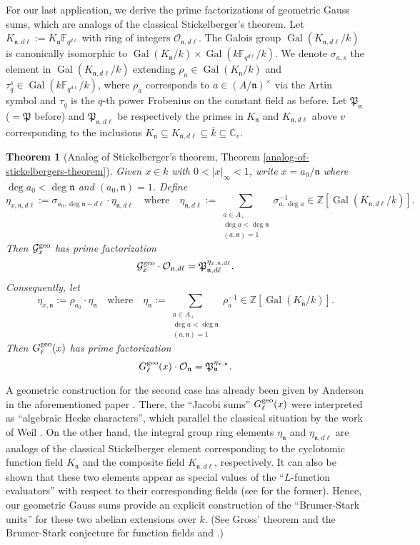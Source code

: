 \documentclass[11pt]{amsart}
\theoremstyle{plain}
\newtheorem{thm}{Theorem}[subsection]
\theoremstyle{definition}
\theoremstyle{remark}
\numberwithin{equation}{section}
\newcommand{\ZZ}{\mathbb{Z}}
\newcommand{\CC}{\mathbb{C}}
\newcommand{\FF}{\mathbb{F}}
\newcommand{\nfk}{\mathfrak{n}}
\newcommand{\Pfk}{\mathfrak{P}}
\newcommand{\Gcal}{\mathcal{G}}
\newcommand{\Ocal}{\mathcal{O}}
\newcommand{\Gal}{\operatorname{Gal}}
\newcommand{\ovl}{\overline}
\newcommand{\sbe}{\subseteq}
\newcommand{\Fqdl}{\FF_{q^{d\l}}}
\newcommand{\bggs}{\Gcal^{\textnormal{geo}}}
\newcommand{\ggs}{G_\l^{\textnormal{geo}}}
\let\l\ell
\begin{document}
	For our last application, we derive the prime factorizations of geometric Gauss sums, which are analogs of the classical Stickelberger's theorem.
	Let $K_{\nfk,d\l} := K_\nfk\Fqdl$ with ring of integers $\Ocal_{\nfk,d\l}$.
	The Galois group $\Gal(K_{\nfk,d\l}/k)$ is canonically isomorphic to $\Gal(K_\nfk/k) \times \Gal(k\Fqdl/k)$.
	We denote $\sigma_{a,s}$ the element in $\Gal(K_{\nfk,d\l}/k)$ extending $\rho_a \in \Gal(K_\nfk/k)$ and $\tau_q^s \in \Gal(k\Fqdl/k)$, where $\rho_a$ corresponds to $a \in (A/\nfk)^\times$ via the Artin symbol and $\tau_q$ is the $q$-th power Frobenius on the constant field as before.
	Let $\Pfk_{\nfk}$ ($=\Pfk$ before) and $\Pfk_{\nfk,d\l}$ be respectively the primes in $K_\nfk$ and $K_{\nfk,d\l}$ above $v$ corresponding to the inclusions $K_\nfk \sbe K_{\nfk,d\l} \sbe \ovl{k} \sbe \CC_v$.
	
	\begin{thm}[Analog of Stickelberger's theorem, Theorem \ref{analog-of-stickelbergers-theorem}]
		Given $x \in k$ with $0 < |x|_\infty < 1$, write $x = a_0/\nfk$ where $\deg a_0 < \deg \nfk$ and $(a_0,\nfk)=1$.
		Define
		$$
		\eta_{x,\nfk,d\l} := \sigma_{a_0,\deg \nfk - d\l} \cdot \eta_{\nfk,d\l}
		\quad
		\text{where}
		\quad
		\eta_{\nfk,d\l} := \sum_{\substack{a\in A_+ \\ \deg a < \deg \nfk \\ (a,\nfk)=1}}  \sigma_{a,\deg a}^{-1} \in \ZZ[\Gal(K_{\nfk,d\l}/k)].
		$$
		Then $\bggs_x$ has prime factorization
		$$
		\bggs_x \cdot \Ocal_{\nfk,d\l}
		= \Pfk_{\nfk,d\l}^{\eta_{x,\nfk,d\l}}.
		$$
		Consequently, let
		$$
		\eta_{x,\nfk} := \rho_{a_0} \cdot \eta_{\nfk}
		\quad
		\text{where}
		\quad
		\eta_{\nfk} := \sum_{\substack{a\in A_+ \\ \deg a < \deg \nfk \\ (a,\nfk)=1}}  \rho_a^{-1} \in \ZZ[\Gal(K_\nfk/k)].
		$$
		Then $\ggs(x)$ has prime factorization
		$$
		\ggs(x) \cdot \Ocal_{\nfk}
		= \Pfk_{\nfk}^{\eta_{x,\nfk}}.
		$$
	\end{thm}
	
	A geometric construction for the second case has already been given by Anderson in the aforementioned paper \cite{anderson1992twodimensional}.
	There, the “Jacobi sums” $\ggs(x)$ were interpreted as “algebraic Hecke characters”, which parallel the classical situation by the work of Weil \cite{weil1952jacobi}.
	On the other hand, the integral group ring elements $\eta_{\nfk}$ and $\eta_{\nfk,d\l}$ are analogs of the classical Stickelberger element corresponding to the cyclotomic function field $K_{\nfk}$ and the composite field $K_{\nfk,d\l}$, respectively.
	It can also be shown that these two elements appear as special values of the “$L$-function evaluators” with respect to their corresponding fields (see \cite[Chapter 15]{rosen2002number} for the former).
	Hence, our geometric Gauss sums provide an explicit construction of the “Brumer-Stark units” for these two abelian extensions over $k$.
	(See Gross' theorem \cite{gross1980annihilation} and the Brumer-Stark conjecture for function fields \cite[Chapter V]{tate1984lesconjectures} and \cite{hayes1985stickelberger}.)
	
\end{document}
